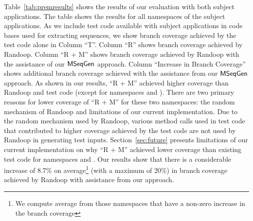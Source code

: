 \documentclass{sig-alternate}
\begin{document}
Table~\ref{tab:premresults} shows the results of our evaluation with both subject applications. The table shows the results for all namespaces of the subject applications. As we include test code available with subject applications in code bases used for extracting sequences, we show branch coverage achieved by the test code alone in Column ``T''. Column ``R'' shows branch coverage achieved by Randoop. Column ``R + M'' shows branch coverage achieved by Randoop with the assistance of our $\textsf{MSeqGen} $ approach. Column ``Increase in Branch Coverage'' shows additional branch coverage achieved with the assistance from our $\textsf{MSeqGen} $ approach. As shown in our results, ``R + M'' achieved higher coverage than Randoop and test code (except for namespaces  and ). There are two primary reasons for lower coverage of ``R + M'' for these two namespaces: the random mechanism of Randoop and limitations of our current implementation. Due to the random mechanism used by Randoop, various method calls used in test code that contributed to higher coverage achieved by the test code are not used by Randoop in generating test inputs. Section~\ref{sec:future} presents limitations of our current implementation on why ``R + M'' achieved lower coverage than existing test code for namespaces  and . Our results show that there is a considerable increase of 8.7\% on average\footnote{We compute average from those namespaces that have a non-zero increase in the branch coverage} (with a maximum of 20\%) in branch coverage achieved by Randoop with assistance from our approach. 
\end{document}
